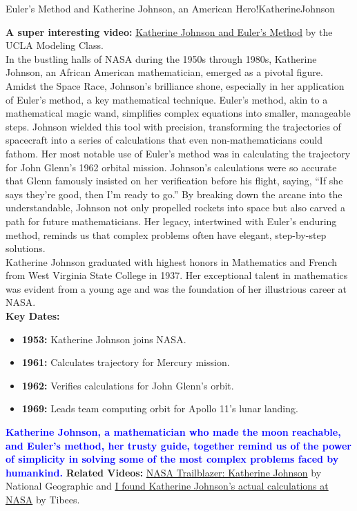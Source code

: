 \begin{funColor}{Euler's Method and Katherine Johnson, an American Hero!}{KatherineJohnson}

\textbf{A super interesting video:} \href{https://youtu.be/gdxYsVniOYo}{Katherine Johnson and Euler's Method} by the UCLA Modeling Class.\\

In the bustling halls of NASA during the 1950s through 1980s, Katherine Johnson, an African American mathematician, emerged as a pivotal figure. Amidst the Space Race, Johnson's brilliance shone, especially in her application of Euler's method, a key mathematical technique.  Euler's method, akin to a mathematical magic wand, simplifies complex equations into smaller, manageable steps. Johnson wielded this tool with precision, transforming the trajectories of spacecraft into a series of calculations that even non-mathematicians could fathom. Her most notable use of Euler's method was in calculating the trajectory for John Glenn's 1962 orbital mission. Johnson's calculations were so accurate that Glenn famously insisted on her verification before his flight, saying, “If she says they're good, then I'm ready to go.” By breaking down the arcane into the understandable, Johnson not only propelled rockets into space but also carved a path for future mathematicians. Her legacy, intertwined with Euler's enduring method, reminds us that complex problems often have elegant, step-by-step solutions. \\

Katherine Johnson graduated with highest honors in Mathematics and French from West Virginia State College in 1937. Her exceptional talent in mathematics was evident from a young age and was the foundation of her illustrious career at NASA. \\

\textbf{Key Dates:}
\begin{itemize}
\item \textbf{1953:} Katherine Johnson joins NASA.
\item \textbf{1961:} Calculates trajectory for Mercury mission.
\item \textbf{1962:} Verifies calculations for John Glenn's orbit.
\item \textbf{1969:} Leads team computing orbit for Apollo 11's lunar landing.
\end{itemize}

\textcolor{blue}{\bf Katherine Johnson, a mathematician who made the moon reachable, and Euler's method, her trusty guide, together remind us of the power of simplicity in solving some of the most complex problems faced by humankind.} \textbf{Related Videos:} \href{https://www.youtube.com/watch?v=E4j_LpKzcZQ}{NASA Trailblazer: Katherine Johnson} by National Geographic and \href{https://youtu.be/78BdxTJ5spY}{I found Katherine Johnson's actual calculations at NASA} by Tibees.

\end{funColor}

